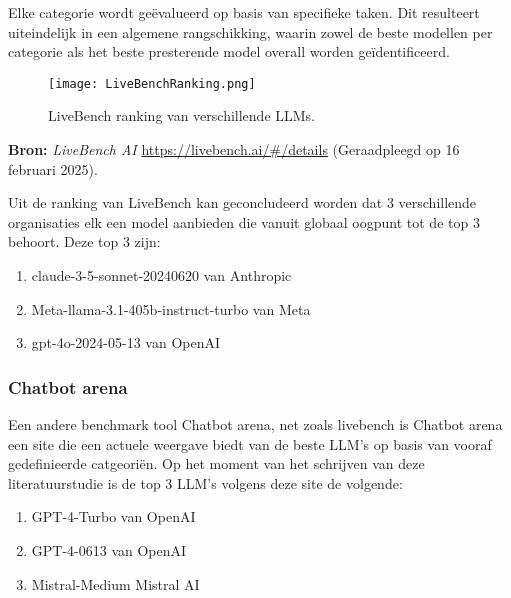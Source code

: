         Elke categorie wordt geëvalueerd op basis van specifieke taken. Dit resulteert uiteindelijk in een algemene rangschikking, waarin zowel de beste modellen per categorie als het beste presterende model overall worden geïdentificeerd.
        
            \begin{figure}[h]
            \centering
            \texttt{[image: LiveBenchRanking.png]}
            \caption{LiveBench ranking van verschillende LLMs.}
            \label{fig:livebench}
            \end{figure}
        
        \noindent\textbf{Bron:} \textit{LiveBench AI} \url{https://livebench.ai/#/details} (Geraadpleegd op 16 februari 2025).
        
        Uit de ranking van LiveBench kan geconcludeerd worden dat 3 verschillende organisaties elk een model aanbieden die vanuit globaal oogpunt tot de top 3 behoort. Deze top 3 zijn: 
            \begin{enumerate}
            \item claude-3-5-sonnet-20240620 van Anthropic
            \item Meta-llama-3.1-405b-instruct-turbo van Meta
            \item gpt-4o-2024-05-13 van OpenAI
            \end{enumerate}
        
        \subsubsection{Chatbot arena} 
        
        Een andere benchmark tool Chatbot arena, net zoals livebench is Chatbot arena een site die een actuele weergave biedt van de beste LLM's op basis van vooraf gedefinieerde catgeoriën. Op het moment van het schrijven van deze literatuurstudie is de top 3 LLM's volgens deze site de volgende:
        
        \begin{enumerate}
        \item GPT-4-Turbo van OpenAI
        \item GPT-4-0613 van OpenAI
        \item Mistral-Medium Mistral AI
        \end{enumerate}
        
